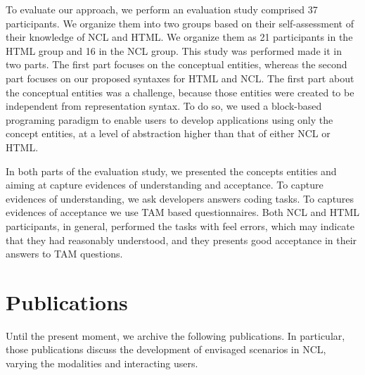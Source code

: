 \documentclass[
  doutorado,
  american
]{ThesisPUC}
\begin{document}
To evaluate our approach, we perform an evaluation study comprised 37 
participants. We organize them into two groups based on their self-assessment 
of their knowledge of NCL and HTML. We organize them as 21 participants in the 
HTML group and 16 in the NCL group. This study was performed made it in two 
parts. The first part focuses on the conceptual entities, whereas the second 
part focuses on our proposed syntaxes for HTML and NCL. The first part about 
the conceptual entities was a challenge, because those entities were created to 
be independent from representation syntax. To do so, we used a block-based 
programing paradigm to enable users to develop applications using only the 
concept entities, at a level of abstraction higher than that of either NCL or 
HTML.

In both parts of the evaluation study, we presented the concepts entities and aiming at capture evidences of understanding and acceptance. To capture evidences of understanding, we ask developers answers coding tasks. To captures evidences of acceptance we use TAM based questionnaires. Both NCL and HTML participants, in general, performed the tasks with feel errors, which may indicate that they had reasonably understood, and they presents good acceptance in their answers to TAM questions.

\section{Publications}
\label{sec:publications}

Until the present moment, we archive the following
publications. In particular, those publications discuss the development of envisaged scenarios in NCL, varying the modalities and interacting users.
\end{document}
